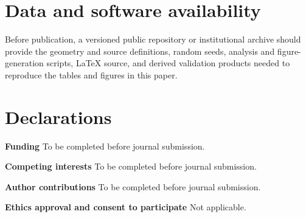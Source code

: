 \documentclass[11pt]{article}
\begin{document}
\section*{Data and software availability}
Before publication, a versioned public repository or institutional archive should provide the geometry and source definitions, random seeds, analysis and figure-generation scripts, LaTeX source, and derived validation products needed to reproduce the tables and figures in this paper.

\section*{Declarations}
\textbf{Funding} To be completed before journal submission.

\textbf{Competing interests} To be completed before journal submission.

\textbf{Author contributions} To be completed before journal submission.

\textbf{Ethics approval and consent to participate} Not applicable.
\end{document}
